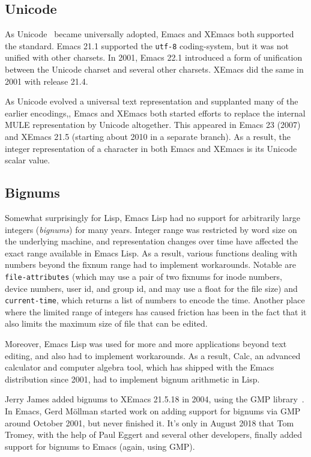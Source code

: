 \documentclass[format=acmsmall, review]{acmart}
\newcommand \Elisp {Emacs Lisp}
\begin{document}
\subsection{Unicode}

As Unicode~\cite{Unicode6} became universally adopted, Emacs and
XEmacs both supported the standard.  Emacs 21.1 supported the
\texttt{utf-8} coding-system, but it was not unified with other
charsets.  In 2001, Emacs 22.1 introduced a form of unification
between the Unicode charset and several other charsets.  XEmacs did
the same in 2001 with release 21.4.

As Unicode evolved a universal text representation and supplanted many
of the earlier encodings,, Emacs and XEmacs both started efforts to
replace the internal MULE representation by Unicode altogether.  This
appeared in Emacs 23 (2007) and XEmacs 21.5 (starting about 2010 in a
separate branch).  As a result, the integer representation of a
character in both Emacs and XEmacs is its Unicode scalar value.

\subsection{Bignums}

Somewhat surprisingly for Lisp, \Elisp{} had no support for
arbitrarily large integers (\emph{bignums}) for many years.
Integer range was restricted by word size on the underlying machine,
and representation changes over time have affected the exact range
available in \Elisp.
As a result, various functions dealing with numbers beyond the fixnum range
had to implement workarounds.  Notable are \texttt{file-attributes} (which
may use a pair of two fixnums for inode numbers, device numbers, user id,
and group id, and may use a float for the file size) and
\texttt{current-time}, which returns a list of numbers to encode the time.
Another place where the limited range of integers has caused friction has
been in the fact that it also limits the maximum size of file that can
be edited.

Moreover, \Elisp{} was used for more and more applications beyond
text editing, and also had to implement workarounds.  As a result,
Calc, an advanced calculator and computer algebra tool, which has
shipped with the Emacs distribution since 2001, had to implement
bignum arithmetic in Lisp.

Jerry James added bignums to XEmacs 21.5.18 in 2004, using the GMP
library~\cite{GMP}.  In Emacs, Gerd Möllman started work on adding support
for bignums via GMP around October 2001, but never finished it.  It's only
in August 2018 that Tom Tromey, with the help of Paul Eggert and several
other developers, finally added support for bignums to Emacs (again, using
GMP).
\end{document}
